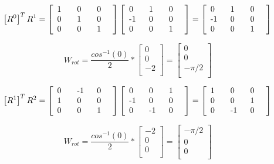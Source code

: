 \[
\left[R^0\right]^T R^1
=
\left[\begin{array}{*{3}{p{0.5cm}}}
  1 & 0 & 0\\
  0 & 1 & 0\\
  0 & 0 & 1\\
\end{array}\right]
\left[\begin{array}{*{3}{p{0.5cm}}}
  0 & 1 & 0\\
 -1 & 0 & 0\\
  0 & 0 & 1\\
\end{array}\right]
=
\left[\begin{array}{*{3}{p{0.5cm}}}
  0 & 1 & 0\\
 -1 & 0 & 0\\
  0 & 0 & 1\\
\end{array}\right]
\]

\[
 W_{rot} = 
 \frac{cos^{-1}(0)}{2} *  
 \left[\begin{array}{c}
  0\\
  0\\
  -2\\
 \end{array}\right] =
 \left[\begin{array}{c}
  0\\
  0\\
  -\pi/2\\
 \end{array}\right] 
\]

\[
\left[R^1\right]^T R^2
=
\left[\begin{array}{*{3}{p{0.5cm}}}
  0 &-1 & 0\\
  1 & 0 & 0\\
  0 & 0 & 1\\
\end{array}\right]
\left[\begin{array}{*{3}{p{0.5cm}}}
  0 & 0 & 1\\
 -1 & 0 & 0\\
  0 &-1 & 0\\
\end{array}\right]
=
\left[\begin{array}{*{3}{p{0.5cm}}}
  1 & 0 & 0\\
  0 & 0 & 1\\
  0 &-1 & 0\\
\end{array}\right]
\] 

\[
 W_{rot} = 
 \frac{cos^{-1}(0)}{2} *
 \left[\begin{array}{c}
  -2\\
  0\\
  0\\
 \end{array}\right] 
 =
 \left[\begin{array}{c}
  -\pi/2\\
  0\\
  0\\
 \end{array}\right] 
\]

